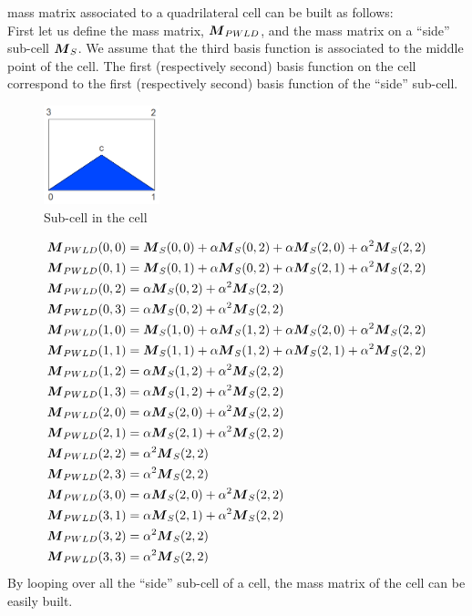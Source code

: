 mass matrix associated to a quadrilateral cell can be built as follows:\\
First let us define the mass matrix, $\boldsymbol{M}_{PWLD}$, and the mass matrix on a 
``side'' sub-cell $\boldsymbol{M}_S$. We assume that the third basis function is associated 
to the middle point of the cell. The first (respectively second) basis function on 
the cell correspond to the first (respectively second) basis function of the 
``side'' sub-cell.
\begin{figure}[H]
  \centering
  \includegraphics[width=0.3\textwidth]{mass_matrix}
  \caption{Sub-cell in the cell}
\end{figure}
{\allowdisplaybreaks
\begin{align}
  & \boldsymbol{M}_{PWLD}(0,0) =  \boldsymbol{M}_S(0,0) + \alpha \boldsymbol{M}_S(0,2) + \alpha
  \boldsymbol{M}_S(2,0) + \alpha^2 \boldsymbol{M}_S(2,2)\\
  & \boldsymbol{M}_{PWLD}(0,1) =  \boldsymbol{M}_S(0,1) + \alpha \boldsymbol{M}_S(0,2) + \alpha
  \boldsymbol{M}_S(2,1) + \alpha^2 \boldsymbol{M}_S(2,2)\\
  & \boldsymbol{M}_{PWLD}(0,2) =  \alpha \boldsymbol{M}_S(0,2) + \alpha^2 \boldsymbol{M}_S(2,2)\\
  & \boldsymbol{M}_{PWLD}(0,3) =  \alpha \boldsymbol{M}_S(0,2) + \alpha^2 \boldsymbol{M}_S(2,2)\\
  & \boldsymbol{M}_{PWLD}(1,0) =  \boldsymbol{M}_S(1,0) + \alpha \boldsymbol{M}_S(1,2) + \alpha
  \boldsymbol{M}_S(2,0) + \alpha^2 \boldsymbol{M}_S(2,2)\\
  & \boldsymbol{M}_{PWLD}(1,1) =  \boldsymbol{M}_S(1,1) + \alpha \boldsymbol{M}_S(1,2) + \alpha
  \boldsymbol{M}_S(2,1) + \alpha^2 \boldsymbol{M}_S(2,2)\\
  & \boldsymbol{M}_{PWLD}(1,2) =  \alpha \boldsymbol{M}_S(1,2) + \alpha^2 \boldsymbol{M}_S(2,2)\\
  & \boldsymbol{M}_{PWLD}(1,3) =  \alpha \boldsymbol{M}_S(1,2) + \alpha^2 \boldsymbol{M}_S(2,2)\\
  & \boldsymbol{M}_{PWLD}(2,0) =  \alpha \boldsymbol{M}_S(2,0) + \alpha^2 \boldsymbol{M}_S(2,2)\\
  & \boldsymbol{M}_{PWLD}(2,1) =  \alpha \boldsymbol{M}_S(2,1) + \alpha^2 \boldsymbol{M}_S(2,2)\\
  & \boldsymbol{M}_{PWLD}(2,2) =  \alpha^2 \boldsymbol{M}_S(2,2)\\
  & \boldsymbol{M}_{PWLD}(2,3) =  \alpha^2 \boldsymbol{M}_S(2,2)\\
  & \boldsymbol{M}_{PWLD}(3,0) =  \alpha \boldsymbol{M}_S(2,0) + \alpha^2 \boldsymbol{M}_S(2,2)\\
  & \boldsymbol{M}_{PWLD}(3,1) =  \alpha \boldsymbol{M}_S(2,1) + \alpha^2 \boldsymbol{M}_S(2,2)\\
  & \boldsymbol{M}_{PWLD}(3,2) =  \alpha^2 \boldsymbol{M}_S(2,2)\\
  & \boldsymbol{M}_{PWLD}(3,3) =  \alpha^2 \boldsymbol{M}_S(2,2)
\end{align}}    
By looping over all the ``side'' sub-cell of a cell, the mass matrix of the 
cell can be easily built.
